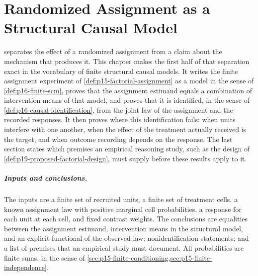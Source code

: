 \chapter{Randomized Assignment as a Structural Causal Model}
\label{sec:p15-w02b-p15-077-assignment-scm}

 separates the effect of a randomized
assignment from a claim about the mechanism that produces it. This chapter
makes the first half of that separation exact in the vocabulary of finite
structural causal models. It writes the finite assignment experiment of
\cref{def:p15-factorial-assignment} as a model in the sense of
\cref{def:p16-finite-scm}, proves that the assignment estimand equals a
combination of intervention means of that model, and proves that it is
identified, in the sense of \cref{def:p16-causal-identification}, from the
joint law of the assignment and the recorded responses. It then proves where
this identification fails: when units interfere with one another, when the
effect of the treatment actually received is the target, and when outcome
recording depends on the response. The last section states which premises an
empirical reasoning study, such as the design of
\cref{def:p19-proposed-factorial-design}, must supply before these results
apply to it.

\paragraph{Inputs and conclusions.}
The inputs are a finite set of recruited units, a finite set of treatment
cells, a known assignment law with positive marginal cell probabilities, a
response for each unit at each cell, and fixed contrast weights. The
conclusions are equalities between the assignment estimand, intervention
means in the structural model, and an explicit functional of the observed
law; nonidentification statements; and a list of premises that an empirical
study must document. All probabilities are finite sums, in the sense of
\cref{sec:p15-finite-conditioning,sec:p15-finite-independence}.

